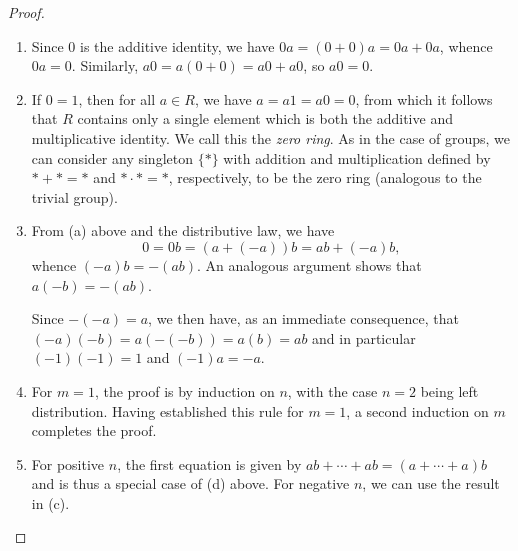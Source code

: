 \begin{proof}\(\)
    \begin{enumerate}[label=(\alph*), wide]
        \item Since \(0\) is the additive identity, we have \(0a = (0 + 0)a = 0a
        + 0a\), whence \(0a = 0\). Similarly, \(a0 = a(0 + 0) = a0 + a0\), so
        \(a0 = 0\).

        \item If \(0 = 1\), then for all \(a \in R\), we have \(a = a1 = a0 =
        0\), from which it follows that \(R\) contains only a single element
        which is both the additive and multiplicative identity. We call this the
        \emph{zero ring}. As in the case of groups, we can consider any
        singleton \(\{*\}\) with addition and multiplication defined by \(* + *
        = *\) and \(* \cdot * = *\), respectively, to be the zero ring
        (analogous to the trivial group).
        
        \item From (a) above and the distributive law, we have
        \[
            0 = 0b = (a + (-a))b = ab + (-a)b,
        \]
        whence \((-a)b = -(ab)\). An analogous argument shows that \(a(-b) =
        -(ab)\).

        Since \(-(-a) = a\), we then have, as an immediate consequence, that
        \((-a)(-b) = a(-(-b)) = a(b) = ab\) and in particular \((-1)(-1) = 1\)
        and \((-1)a = -a\).

        \item For \(m = 1\), the proof is by induction on \(n\), with the case
        \(n = 2\) being left distribution. Having established this rule for \(m
        = 1\), a second induction on \(m\) completes the proof.
        
        \item For positive \(n\), the first equation is given by \(ab + \cdots +
        ab = (a + \cdots + a)b\) and is thus a special case of (d) above. For
        negative \(n\), we can use the result in (c).


\end{enumerate}
\end{proof}
